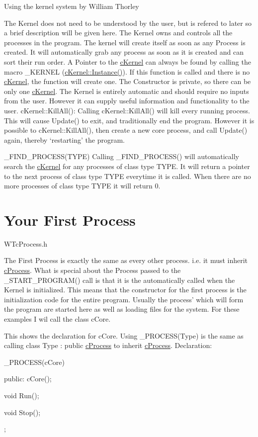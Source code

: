 Using the kernel system by William Thorley

The Kernel does not need to be understood by the user, but is refered to later so a brief description will be given here. The Kernel owns and controls all the processes in the program. The kernel will create itself as soon as any Process is created. It will automatically grab any process as soon as it is created and can sort their run order. A Pointer to the \hyperlink{classc_kernel}{cKernel} can always be found by calling the macro \_\-KERNEL (\hyperlink{classc_kernel_a1d873e903cf2bccceee0a68bd9d4dd01}{cKernel::Instance()}). If this function is called and there is no \hyperlink{classc_kernel}{cKernel}, the function will create one. The Constructor is private, so there can be only one \hyperlink{classc_kernel}{cKernel}. The Kernel is entirely automatic and should require no inputs from the user. However it can supply useful information and functionality to the user. cKernel::KillAll(): Calling cKernel::KillAll() will kill every running process. This will cause Update() to exit, and traditionally end the program. However it is possible to cKernel::KillAll(), then create a new core process, and call Update() again, thereby ‘restarting’ the program.

\_\-FIND\_\-PROCESS(TYPE) Calling \_\-FIND\_\-PROCESS() will automatically search the \hyperlink{classc_kernel}{cKernel} for any processes of class type TYPE. It will return a pointer to the next process of class type TYPE everytime it is called. When there are no more processes of class type TYPE it will return 0. \hypertarget{_using_engine_page_FirstProcessPage}{}\section{Your First Process}\label{_using_engine_page_FirstProcessPage}
WTcProcess.h

The First Process is exactly the same as every other process. i.e. it must inherit \hyperlink{classc_process}{cProcess}. What is special about the Process passed to the \_\-START\_\-PROGRAM() call is that it is the automatically called when the Kernel is initialized. This means that the constructor for the first process is the initialization code for the entire program. Usually the process’ which will form the program are started here as well as loading files for the system. For these examples I wil call the class cCore.

This shows the declaration for cCore. Using \_\-PROCESS(Type) is the same as calling class Type : public \hyperlink{classc_process}{cProcess} to inherit \hyperlink{classc_process}{cProcess}. Declaration: 
\begin{DoxyCode}
 _PROCESS(cCore)
 {
  public:
  cCore();

  void Run();

  void Stop();

 };
\end{DoxyCode}



